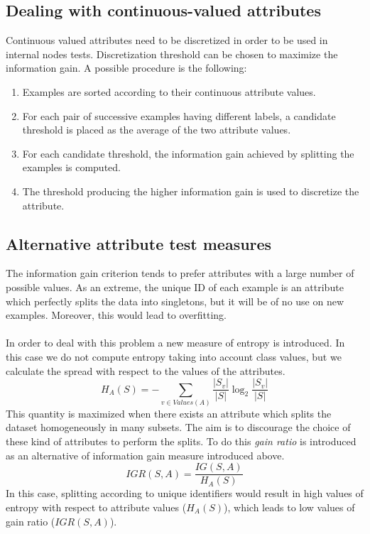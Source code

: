 \subsection{Dealing with continuous-valued attributes}
Continuous valued attributes need to be discretized in order to be used in internal nodes tests. Discretization threshold can be chosen to maximize the information gain. A possible procedure is the following:
\begin{enumerate}
    \item Examples are sorted according to their continuous attribute values.
    \item For each pair of successive examples having different labels, a candidate threshold is placed as the average of the two attribute values.
    \item For each candidate threshold, the information gain achieved by splitting the examples is computed.
    \item The threshold producing the higher information gain is used to discretize the attribute.
\end{enumerate}

\subsection{Alternative attribute test measures}
The information gain criterion tends to prefer attributes with a large number of possible values. As an extreme, the unique ID of each example is an attribute which perfectly splits the data into singletons, but it will be of no use on new examples. Moreover, this would lead to overfitting.
\paragraph{}
In order to deal with this problem a new measure of entropy is introduced. In this case we do not compute entropy taking into account class values, but we calculate the spread with respect to the values of the attributes. \begin{equation}
    H_A(S) = -\sum_{v \in \mathit{Values}(A)} \frac{|S_v|}{|S|}\log_{2}{\frac{|S_v|}{|S|}}
\end{equation}
This quantity is maximized when there exists an attribute which splits the dataset homogeneously in many subsets. The aim is to discourage the choice of these kind of attributes to perform the splits. To do this \textit{gain ratio} is introduced as an alternative of information gain measure introduced above.
\begin{equation}
    \mathit{IGR}(S,A) = \frac{\mathit{IG}(S,A)}{H_A(S)}
\end{equation}
In this case, splitting according to unique identifiers would result in high values of entropy with respect to attribute values ($H_A(S)$), which leads to low values of gain ratio ($\mathit{IGR}(S,A)$).

